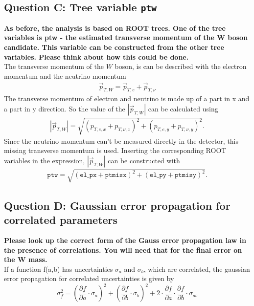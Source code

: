 \subsection{Question C: Tree variable \texttt{ptw}}
\label{sec:QuestionC}
\textbf{As before, the analysis is based on ROOT trees. One of the tree variables is ptw -
the estimated transverse momentum of the W boson candidate. This variable can
be constructed from the other tree variables. Please think about how this could be
done.} \cite{atlaslabmanual} \\

The transverse momentum of the $W$ boson, is can be described with the electron momentum and the neutrino momentum 
\begin{align*}
    \vec{p}_{T,W} = \vec{p}_{T,e} + \vec{p}_{T,\nu}
\end{align*}
The transverse momentum of electron and neutrino is made up of a part in x and a part in y direction. So the value of the  $\left|\vec{p}_{T,W}\right|$ can be calculated
using 
\begin{align*}
    |\vec{p}_{T,W}| = \sqrt{(p_{T,e,x} + p_{T,\nu,x})^2 + (p_{T,e,y} + p_{T,\nu,y})^2}.
\end{align*}
Since the neutrino momentum can't be measured directly in the detector, this missing transverse momentum is used. 
Inserting the corresponding ROOT variables in the expression, $\left|\vec{p}_{T,W}\right|$ can be constructed with 
\begin{align*}
    \texttt{ptw} = \sqrt{(\texttt{el\_px} + \texttt{ptmisx})^2 + (\texttt{el\_py} + \texttt{ptmisy})^2}.
\end{align*}

\subsection{Question D: Gaussian error propagation for correlated parameters}
\label{sec:QuestionC}
\textbf{Please look up the correct form of the Gauss
error propagation law in the presence of correlations. You will need that for the final error
on the W mass.} \cite{atlaslabmanual} \\
If a function f(a,b) has uncertainties $\sigma_a$ and $\sigma_b$, which are correlated, the gaussian error propagation for correlated uncertainties is given by
\begin{equation*}
\sigma_f^2 = \left( \frac{\partial f}{\partial a} \cdot \sigma_a \right)^2 + \left( \frac{\partial f}{\partial b} \cdot \sigma_b \right)^2 + 2 \cdot \frac{\partial f}{\partial a} \cdot \frac{\partial f}{\partial b} \cdot \sigma_{ab}
\end{equation*}

